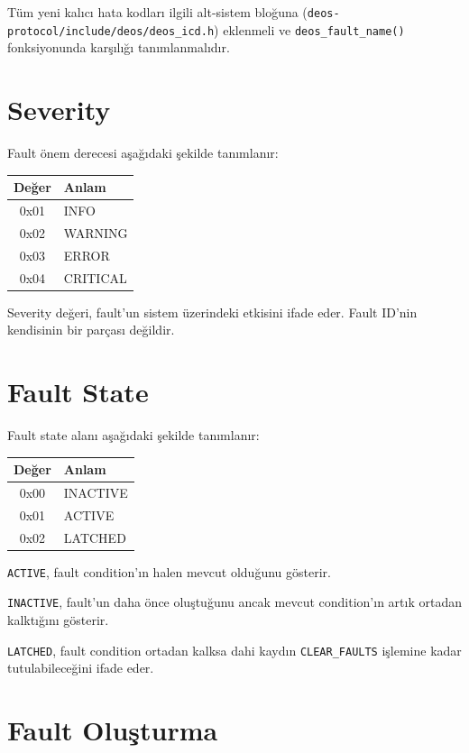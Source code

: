 \documentclass[a4paper,11pt]{article}
\newcommand{\code}[1]{\texttt{#1}}
\begin{document}
Tüm yeni kalıcı hata kodları ilgili alt-sistem bloğuna (\code{deos-protocol/include/deos/deos\_icd.h}) eklenmeli ve \code{deos\_fault\_name()} fonksiyonunda karşılığı tanımlanmalıdır.

\section{Severity}

Fault önem derecesi aşağıdaki şekilde tanımlanır:

\begin{center}
\begin{tabular}{c l}
\toprule
\textbf{Değer} & \textbf{Anlam} \\
\midrule
0x01 & INFO \\
0x02 & WARNING \\
0x03 & ERROR \\
0x04 & CRITICAL \\
\bottomrule
\end{tabular}
\end{center}

Severity değeri, fault'un sistem üzerindeki etkisini ifade eder.
Fault ID'nin kendisinin bir parçası değildir.

\section{Fault State}

Fault state alanı aşağıdaki şekilde tanımlanır:

\begin{center}
\begin{tabular}{c l}
\toprule
\textbf{Değer} & \textbf{Anlam} \\
\midrule
0x00 & INACTIVE \\
0x01 & ACTIVE \\
0x02 & LATCHED \\
\bottomrule
\end{tabular}
\end{center}

\texttt{ACTIVE}, fault condition'ın halen mevcut olduğunu gösterir.

\texttt{INACTIVE}, fault'un daha önce oluştuğunu ancak mevcut
condition'ın artık ortadan kalktığını gösterir.

\texttt{LATCHED}, fault condition ortadan kalksa dahi kaydın
\texttt{CLEAR\_FAULTS} işlemine kadar tutulabileceğini ifade eder.

\section{Fault Oluşturma}
\end{document}
